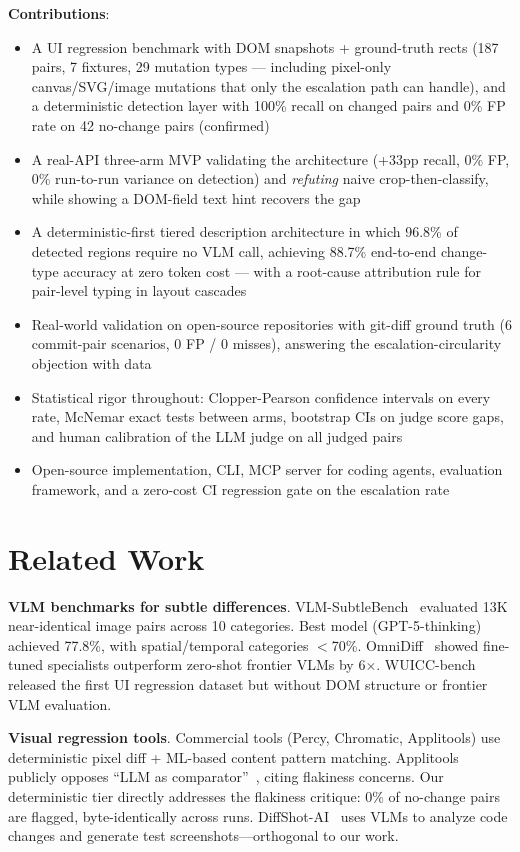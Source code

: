 \documentclass[10pt,twocolumn,letterpaper]{article}
\begin{document}
\textbf{Contributions}:
\begin{itemize}
\item A UI regression benchmark with DOM snapshots + ground-truth rects (187 pairs, 7 fixtures, 29 mutation types — including pixel-only canvas/SVG/image mutations that only the escalation path can handle), and a deterministic detection layer with 100\% recall on changed pairs and 0\% FP rate on 42 no-change pairs (confirmed)
\item A real-API three-arm MVP validating the architecture (+33pp recall, 0\% FP, 0\% run-to-run variance on detection) and \textit{refuting} naive crop-then-classify, while showing a DOM-field text hint recovers the gap
\item A deterministic-first tiered description architecture in which 96.8\% of detected regions require no VLM call, achieving 88.7\% end-to-end change-type accuracy at zero token cost — with a root-cause attribution rule for pair-level typing in layout cascades
\item Real-world validation on open-source repositories with git-diff ground truth (6 commit-pair scenarios, 0 FP / 0 misses), answering the escalation-circularity objection with data
\item Statistical rigor throughout: Clopper-Pearson confidence intervals on every rate, McNemar exact tests between arms, bootstrap CIs on judge score gaps, and human calibration of the LLM judge on all judged pairs
\item Open-source implementation, CLI, MCP server for coding agents, evaluation framework, and a zero-cost CI regression gate on the escalation rate
\end{itemize}

\section{Related Work}

\textbf{VLM benchmarks for subtle differences}. VLM-SubtleBench~\cite{vlmsubtlebench2026} evaluated 13K near-identical image pairs across 10 categories. Best model (GPT-5-thinking) achieved 77.8\%, with spatial/temporal categories $<$70\%. OmniDiff~\cite{omnidiff2026} showed fine-tuned specialists outperform zero-shot frontier VLMs by 6$\times$. WUICC-bench~\cite{wuicc2026} released the first UI regression dataset but without DOM structure or frontier VLM evaluation.

\textbf{Visual regression tools}. Commercial tools (Percy, Chromatic, Applitools) use deterministic pixel diff + ML-based content pattern matching. Applitools publicly opposes ``LLM as comparator''~\cite{applitools2026mcp}, citing flakiness concerns. Our deterministic tier directly addresses the flakiness critique: 0\% of no-change pairs are flagged, byte-identically across runs. DiffShot-AI~\cite{diffshot2026} uses VLMs to analyze code changes and generate test screenshots—orthogonal to our work.
\end{document}
